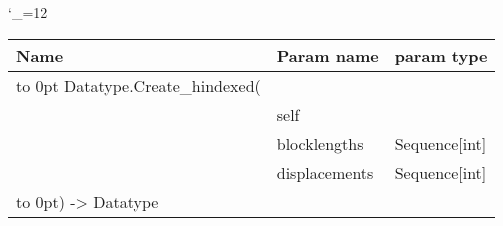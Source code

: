\begingroup \catcode`\_=12 \tt
\begin{tabular}{lll}
\toprule
\textrm{Name}&\textrm{Param name}&\textrm{param type}\\
\midrule
\hbox to 0pt {Datatype.Create_hindexed(\hss}\\
& self\\
& blocklengths & Sequence[int]\\
& displacements & Sequence[int]\\
\hbox to 0pt{) -> Datatype\hss}\\
\bottomrule
\end{tabular}
\endgroup

